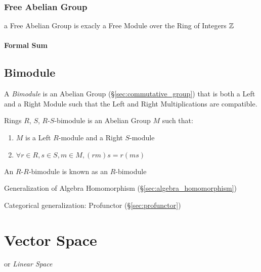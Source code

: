 \subsubsection{Free Abelian Group}\label{sec:free_commutative_group}

a Free Abelian Group is exacly a Free Module over the Ring of Integers $\mathbb{Z}$



\paragraph{Formal Sum}\label{sec:formal_sum}\hfill



\subsection{Bimodule}\label{sec:bimodule}

A \emph{Bimodule} is an Abelian Group (\S\ref{sec:commutative_group}) that is
both a Left and a Right Module such that the Left and Right Multiplications are
compatible.

Rings $R$, $S$, $R$-$S$-bimodule is an Abelian Group $M$ such that:

\begin{enumerate}
\item $M$ is a Left $R$-module and a Right $S$-module
\item $\forall r \in R, s \in S, m \in M, (rm)s = r(ms)$
\end{enumerate}

An $R$-$R$-bimodule is known as an $R$-bimodule

Generalization of Algebra Homomorphism
(\S\ref{sec:algebra_homomorphism})

Categorical generalization: Profunctor (\S\ref{sec:profunctor})



\section{Vector Space}\label{sec:vector_space}

or \emph{Linear Space}

